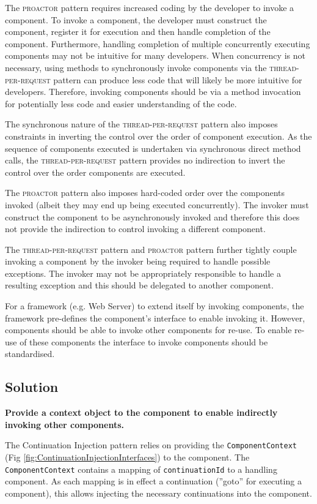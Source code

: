 \documentclass[prodmode]{style/acmlarge}
\begin{document}
The \textsc{proactor} pattern requires increased coding by the developer to
invoke a component.  To invoke a component, the developer must construct the
component, register it for execution and then handle completion of the
component.  Furthermore, handling completion of multiple concurrently executing
components may not be intuitive for many developers.  When concurrency is not
necessary, using methods to synchronously invoke components via the
\textsc{thread-per-request} pattern can produce less code that will likely be
more intuitive for developers.  Therefore, invoking components should be via a
method invocation for potentially less code and easier understanding of the
code.

The synchronous nature of the \textsc{thread-per-request} pattern also imposes
constraints in inverting the control over the order of component execution.  As
the sequence of components executed is undertaken via synchronous direct method
calls, the \textsc{thread-per-request} pattern provides no indirection to invert
the control over the order components are executed.

The \textsc{proactor} pattern also imposes hard-coded order over the components
invoked (albeit they may end up being executed concurrently).  The invoker must
construct the component to be asynchronously invoked and therefore this does not
provide the indirection to control invoking a different component.

The \textsc{thread-per-request} pattern and \textsc{proactor} pattern further
tightly couple invoking a component by the invoker being required to handle
possible exceptions.  The invoker may not be appropriately responsible to handle
a resulting exception and this should be delegated to another component.

For a framework (e.g. Web Server) to extend itself by invoking components, the
framework pre-defines the component's interface to enable invoking it.  However,
components should be able to invoke other components for re-use.  To enable
re-use of these components the interface to invoke components should be
standardised.


\subsection{Solution}

\textbf{Provide a context object to the component to enable indirectly invoking other components.}

The Continuation Injection pattern relies on providing the
\texttt{ComponentContext} (Fig \ref{fig:ContinuationInjectionInterfaces}) to the
component.  The \texttt{ComponentContext} contains a mapping of
\texttt{continuationId} to a handling component.  As each mapping is in effect a
continuation (''goto'' for executing a component), this allows injecting the
necessary continuations into the component.  
\end{document}
